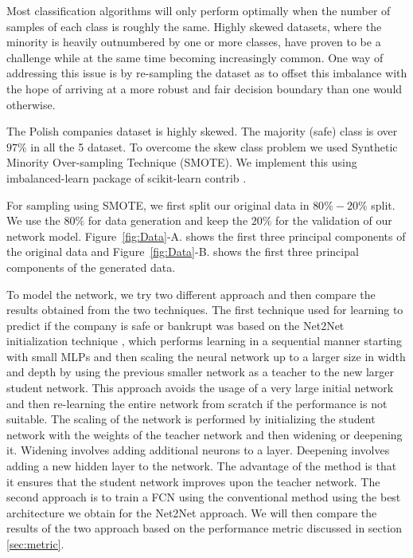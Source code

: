 Most classification algorithms will only perform optimally when the number of samples of each class is roughly the same. Highly skewed datasets, where the minority is heavily outnumbered by one or more classes, have proven to be a challenge while at the same time becoming increasingly common. One way of addressing this issue is by re-sampling the dataset as to offset this imbalance with the hope of arriving at a more robust and fair decision boundary than one would otherwise. 


The Polish companies dataset is highly skewed. The majority (safe) class is over $97\%$ in all the 5 dataset. To overcome the skew class problem we used Synthetic Minority Over-sampling Technique (SMOTE). We implement this using imbalanced-learn package of scikit-learn contrib \cite{JMLR:v18:16-365}. 

For sampling using SMOTE, we first split our original data in $80\%-20\%$ split. We use the $80\%$ for data generation and keep the $20\%$ for the validation of our network model. Figure~\ref{fig:Data}-A. shows the first three principal components of the original data and Figure~\ref{fig:Data}-B. shows the first three principal components of the generated data. 

To model the network, we try two different approach and then compare the results obtained from the two techniques. The first technique used for learning to predict if the company is safe or bankrupt was based on the Net2Net initialization technique \cite{net2net}, which performs learning in a sequential manner starting with small MLPs and then scaling the neural network up to a larger size in width and depth by using the previous smaller network as a teacher to the new larger student network. This approach avoids the usage of a very large initial network and then re-learning the entire network from scratch if the performance is not suitable. The scaling of the network is performed by initializing the student network with the weights of the teacher network and then widening or deepening it. Widening involves adding additional neurons to a layer. Deepening involves adding a new hidden layer to the network. The advantage of the method is that it ensures that the student network improves upon the teacher network. The second approach is to train a FCN using the conventional method using the best architecture we obtain for the Net2Net approach. We will then compare the results of the two approach based on the performance metric discussed in section \ref{sec:metric}.


